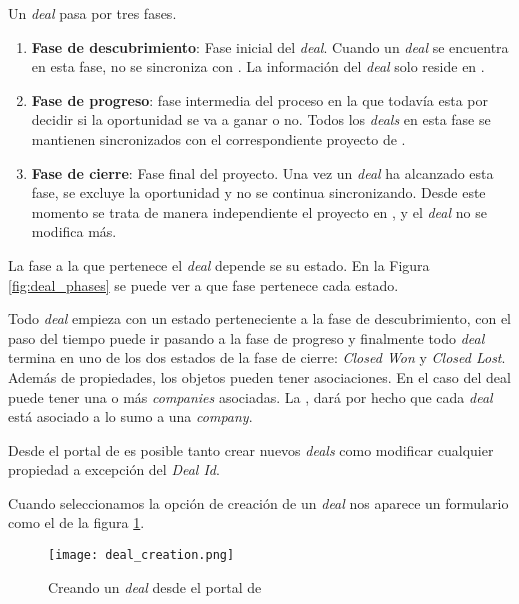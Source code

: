 		
		
		
		
		Un \textit{deal} pasa por tres fases.
		
		\begin{enumerate}
			\item \textbf{Fase de descubrimiento}: Fase inicial del \textit{deal}. Cuando un \textit{deal} se encuentra en esta fase, no se sincroniza con \wday. La información del \textit{deal} solo reside en \hs.
			\item \textbf{Fase de progreso}: fase intermedia del proceso en la que todavía esta por decidir si la oportunidad se va a ganar o no. Todos los \textit{deals} en esta fase se mantienen sincronizados con el correspondiente proyecto de \wday.
			\item \textbf{Fase de cierre}: Fase final del proyecto. Una vez un \textit{deal} ha alcanzado esta fase, se excluye la oportunidad y no se continua sincronizando. Desde este momento se trata de manera independiente el proyecto en \wday{}, y el \textit{deal} no se modifica más. 
		\end{enumerate}
	
		La fase a la que pertenece el \textit{deal} depende se su estado. En la Figura \ref{fig:deal_phases} se puede ver a que fase pertenece cada estado.
		
		
		Todo \textit{deal} empieza con un estado perteneciente a la fase de descubrimiento, con el paso del tiempo puede ir pasando a la fase de progreso y finalmente todo \textit{deal} termina en uno de los dos estados de la fase de cierre: \textit{Closed Won} y \textit{Closed Lost}.\\
			
			
		Además de propiedades, los objetos pueden tener asociaciones. En el caso del deal puede tener una o más \textit{companies} asociadas. La \iface{}, dará por hecho que cada \textit{deal} está asociado a lo sumo a una \textit{company}.
			
		Desde el portal de \hs{} es posible tanto crear nuevos \textit{deals} como modificar cualquier propiedad a excepción del \textit{Deal Id}.
		
		Cuando seleccionamos la opción de creación de un \textit{deal} nos aparece un formulario como el de la figura \ref{fig:create_deal}.
		
		\begin{figure}
			\centering
			\texttt{[image: deal\_creation.png]}
			\caption{Creando un \textit{deal} desde el portal de \hs{}}
			\label{fig:create_deal}
		\end{figure}

